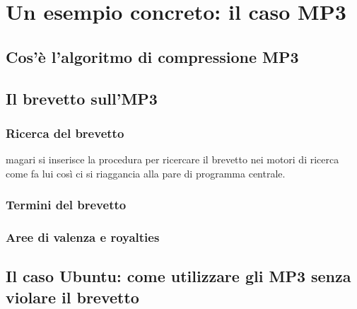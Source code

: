 \chapter{Un esempio concreto: il caso MP3}

\section{Cos'è l'algoritmo di compressione MP3}

\section{Il brevetto sull'MP3}

\subsection{Ricerca del brevetto}magari si inserisce la procedura per ricercare il brevetto nei motori di ricerca come fa lui
così ci si riaggancia alla pare di programma centrale. 

\subsection{Termini del brevetto}

\subsection{Aree di valenza e royalties}

\section{Il caso Ubuntu: come utilizzare gli MP3 senza violare il brevetto}

